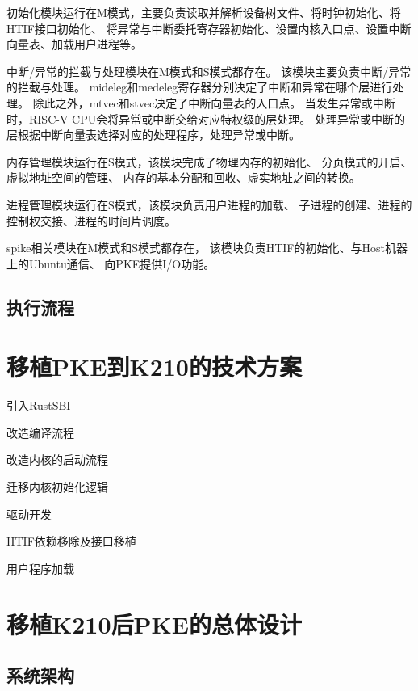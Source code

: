 初始化模块运行在M模式，主要负责读取并解析设备树文件、将时钟初始化、将HTIF接口初始化、
将异常与中断委托寄存器初始化、设置内核入口点、设置中断向量表、加载用户进程等。

中断/异常的拦截与处理模块在M模式和S模式都存在。
该模块主要负责中断/异常的拦截与处理。
mideleg和medeleg寄存器分别决定了中断和异常在哪个层进行处理。
除此之外，mtvec和stvec决定了中断向量表的入口点。
当发生异常或中断时，RISC-V CPU会将异常或中断交给对应特权级的层处理。
处理异常或中断的层根据中断向量表选择对应的处理程序，处理异常或中断。

内存管理模块运行在S模式，该模块完成了物理内存的初始化、
分页模式的开启、虚拟地址空间的管理、
内存的基本分配和回收、虚实地址之间的转换。

进程管理模块运行在S模式，该模块负责用户进程的加载、
子进程的创建、进程的控制权交接、进程的时间片调度。

spike相关模块在M模式和S模式都存在，
该模块负责HTIF的初始化、与Host机器上的Ubuntu通信、
向PKE提供I/O功能。

\subsection{执行流程}

\section{移植PKE到K210的技术方案}

引入RustSBI

改造编译流程

改造内核的启动流程

迁移内核初始化逻辑

驱动开发

HTIF依赖移除及接口移植

用户程序加载

\section{移植K210后PKE的总体设计}

\subsection{系统架构}

